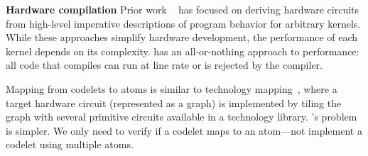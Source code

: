 \textbf{Hardware compilation}
Prior work ~\cite{nurvadathi, cash, bluespec} has focused on deriving hardware
circuits from high-level imperative descriptions of program behavior for
arbitrary kernels. While these approaches simplify hardware development, the
performance of each kernel depends on its complexity.  \pktlanguage has an
all-or-nothing approach to performance: all code that compiles can run at
line rate or is rejected by the compiler.

Mapping from codelets to atoms is similar to technology mapping~\cite{micheli,
flowmap, spectransform}, where a target hardware circuit (represented as a
graph) is implemented by tiling the graph with several primitive circuits
available in a technology library. \pktlanguage's problem is simpler. We only
need to verify if a codelet maps to an atom---not implement a codelet using
multiple atoms.
